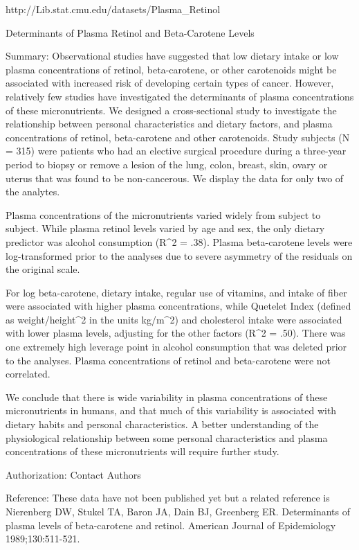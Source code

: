 http://Lib.stat.cmu.edu/datasets/Plasma_Retinol

Determinants of Plasma Retinol and Beta-Carotene Levels

Summary:
Observational studies have suggested that low dietary intake or low plasma concentrations of retinol, beta-carotene, or other carotenoids might be associated with increased risk of developing certain types of cancer.  However, relatively few studies have investigated the determinants of plasma concentrations of these micronutrients. We designed a cross-sectional study to investigate the relationship between personal characteristics and dietary factors, and plasma concentrations of retinol, beta-carotene and other carotenoids. Study subjects (N = 315) were patients who had an elective surgical procedure during a three-year period to biopsy or remove a lesion of the lung, colon, breast, skin, ovary or uterus that was found to be non-cancerous. We display the data for only two of the analytes.
	
Plasma concentrations of the micronutrients varied widely from subject to subject.  While plasma retinol levels varied by age and sex, the only dietary predictor was alcohol consumption (R^2 = .38). Plasma beta-carotene levels were log-transformed prior to the analyses due to severe asymmetry of the residuals on the original scale.
	
For log beta-carotene, dietary intake, regular use of vitamins, and intake of fiber were associated with higher plasma concentrations, while Quetelet Index (defined as weight/height^2 in the units kg/m^2) and cholesterol intake were associated with lower plasma levels, adjusting for the other factors (R^2 = .50). There was one extremely high leverage point in alcohol consumption that was deleted prior to the analyses. Plasma concentrations of retinol and beta-carotene were not correlated.
	
We conclude that there is wide variability in plasma concentrations of these micronutrients in humans, and that much of this variability is associated with dietary habits and personal characteristics.  A better understanding of the physiological relationship between some personal characteristics and plasma concentrations of these micronutrients will require further study.

Authorization: Contact Authors

Reference: These data have not been published yet but a related reference is
Nierenberg DW, Stukel TA, Baron JA, Dain BJ, Greenberg ER.  
Determinants of plasma levels of beta-carotene and retinol.  American Journal of Epidemiology 1989;130:511-521.

